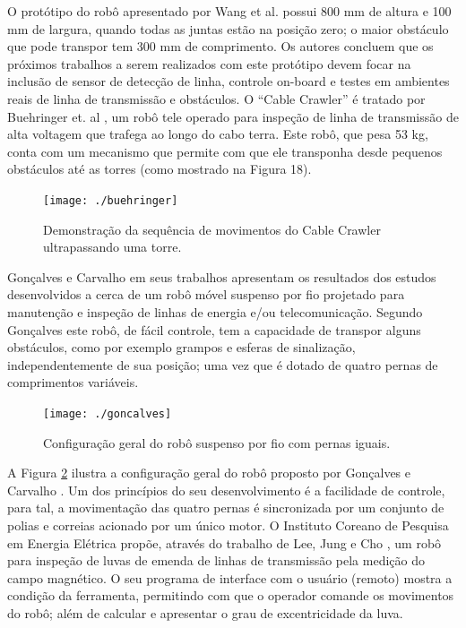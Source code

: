 O protótipo do robô apresentado por Wang et al. \cite{wang2010design} possui 800 mm de altura e 100 mm de largura, quando todas as juntas estão na posição zero; o maior obstáculo que pode transpor tem 300 mm de comprimento. Os autores concluem que os próximos trabalhos a serem realizados com este protótipo devem focar na inclusão de sensor de detecção de linha, controle on-board e testes em ambientes reais de linha de transmissão e obstáculos.  
O “Cable Crawler” é tratado por Buehringer et. al \cite{buhringer2010cable}, um robô tele operado para inspeção de linha de transmissão de alta voltagem que trafega ao longo do cabo terra. Este robô, que pesa 53 kg, conta com um mecanismo que permite com que ele transponha desde pequenos obstáculos até as torres (como mostrado na Figura 18). 

\begin{figure} [h!]	
	\caption{Demonstração da sequência de movimentos do Cable Crawler ultrapassando uma torre.}
	\label{img:buehringer}											 
	\centering													 
	\texttt{[image: ./buehringer]}
\end{figure}													 

Gonçalves e Carvalho em seus trabalhos \cite{goncalves2010graphical} \cite{gonccalves2013review}  apresentam os resultados dos estudos desenvolvidos a cerca de um robô móvel suspenso por fio projetado para manutenção e inspeção de linhas de energia e/ou telecomunicação. Segundo Gonçalves \cite{gonccalves2006kinematics} este robô, de fácil controle, tem a capacidade de transpor alguns obstáculos, como por exemplo grampos e esferas de sinalização, independentemente de sua posição; uma vez que é dotado de quatro pernas de comprimentos variáveis.

\begin{figure} [h!]	
	\caption{Configuração geral do robô suspenso por fio com pernas iguais.}
	\label{img:goncalves}											 
	\centering													 
	\texttt{[image: ./goncalves]}
\end{figure}													 

A Figura \ref{img:goncalves} ilustra a configuração geral do robô proposto por Gonçalves e Carvalho \cite{gonccalves2006kinematics} \cite{goncalves2010graphical}. Um dos princípios do seu desenvolvimento é a  facilidade de controle, para tal, a movimentação das quatro pernas é sincronizada por um conjunto de polias e correias acionado por um único motor. 
O Instituto Coreano de Pesquisa em Energia Elétrica propõe, através do trabalho de Lee, Jung e Cho \cite{lee2011development}, um robô para inspeção de luvas de emenda de linhas de transmissão pela medição do campo magnético. O seu programa de interface com o usuário (remoto) mostra a condição da ferramenta, permitindo com que o operador comande os movimentos do robô; além de calcular e apresentar o grau de excentricidade da luva.  


